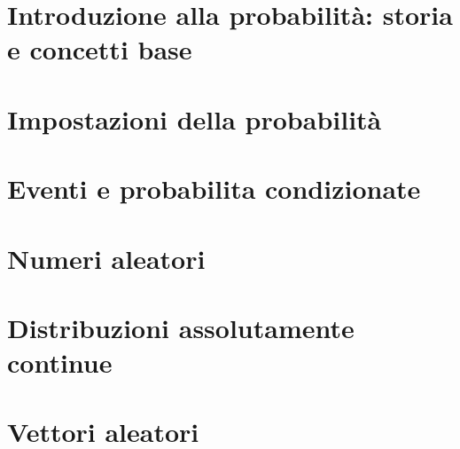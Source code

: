 \documentclass[italian, twoside]{../../../Resources/Utils/ClassNotes}
\begin{document}

\section{Introduzione alla probabilità: storia e concetti base}


\section{Impostazioni della probabilità}


\section{Eventi e probabilita condizionate}


\section{Numeri aleatori}


\section{Distribuzioni assolutamente continue}


\section{Vettori aleatori}

\end{document}

